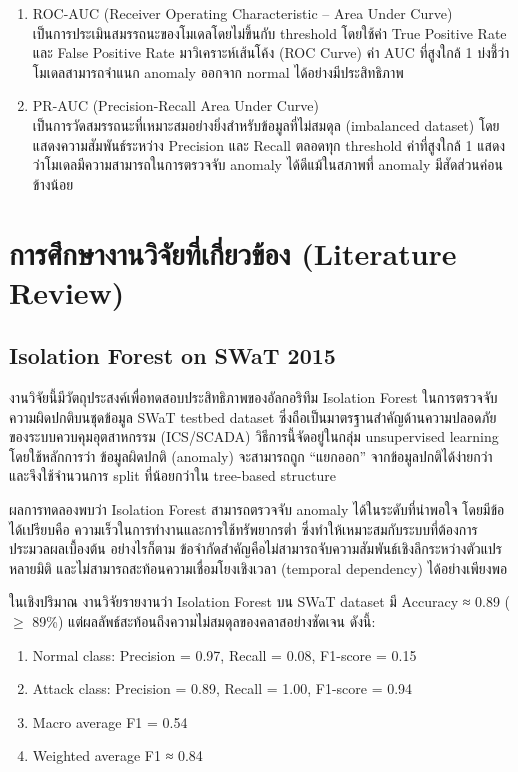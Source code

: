 \begin{enumerate}
\item ROC-AUC (Receiver Operating Characteristic – Area Under Curve) \\ เป็นการประเมินสมรรถนะของโมเดลโดยไม่ขึ้นกับ threshold โดยใช้ค่า True Positive Rate และ False Positive Rate มาวิเคราะห์เส้นโค้ง (ROC Curve) ค่า AUC ที่สูงใกล้ 1 บ่งชี้ว่าโมเดลสามารถจำแนก anomaly ออกจาก normal ได้อย่างมีประสิทธิภาพ
\item PR-AUC (Precision-Recall Area Under Curve) \\ เป็นการวัดสมรรถนะที่เหมาะสมอย่างยิ่งสำหรับข้อมูลที่ไม่สมดุล (imbalanced dataset) โดยแสดงความสัมพันธ์ระหว่าง Precision และ Recall ตลอดทุก threshold ค่าที่สูงใกล้ 1 แสดงว่าโมเดลมีความสามารถในการตรวจจับ anomaly ได้ดีแม้ในสภาพที่ anomaly มีสัดส่วนค่อนข้างน้อย
\end{enumerate}

\section{การศึกษางานวิจัยที่เกี่ยวข้อง (Literature Review)}

\subsection{Isolation Forest on SWaT 2015}
\hspace{2em} งานวิจัยนี้มีวัตถุประสงค์เพื่อทดสอบประสิทธิภาพของอัลกอริทึม Isolation Forest ในการตรวจจับความผิดปกติบนชุดข้อมูล SWaT testbed dataset ซึ่งถือเป็นมาตรฐานสำคัญด้านความปลอดภัยของระบบควบคุมอุตสาหกรรม (ICS/SCADA) วิธีการนี้จัดอยู่ในกลุ่ม unsupervised learning โดยใช้หลักการว่า ข้อมูลผิดปกติ (anomaly) จะสามารถถูก “แยกออก” จากข้อมูลปกติได้ง่ายกว่า และจึงใช้จำนวนการ split ที่น้อยกว่าใน tree-based structure

ผลการทดลองพบว่า Isolation Forest สามารถตรวจจับ anomaly ได้ในระดับที่น่าพอใจ โดยมีข้อได้เปรียบคือ ความเร็วในการทำงานและการใช้ทรัพยากรต่ำ ซึ่งทำให้เหมาะสมกับระบบที่ต้องการประมวลผลเบื้องต้น อย่างไรก็ตาม ข้อจำกัดสำคัญคือไม่สามารถจับความสัมพันธ์เชิงลึกระหว่างตัวแปรหลายมิติ และไม่สามารถสะท้อนความเชื่อมโยงเชิงเวลา (temporal dependency) ได้อย่างเพียงพอ

ในเชิงปริมาณ งานวิจัยรายงานว่า Isolation Forest บน SWaT dataset มี Accuracy ≈ 0.89 ($\ge$ 89\%) แต่ผลลัพธ์สะท้อนถึงความไม่สมดุลของคลาสอย่างชัดเจน ดังนี้:

\begin{enumerate}
  \item Normal class: Precision = 0.97, Recall = 0.08, F1-score = 0.15
  \item Attack class: Precision = 0.89, Recall = 1.00, F1-score = 0.94
  \item Macro average F1 = 0.54
  \item Weighted average F1 ≈ 0.84
\end{enumerate}

